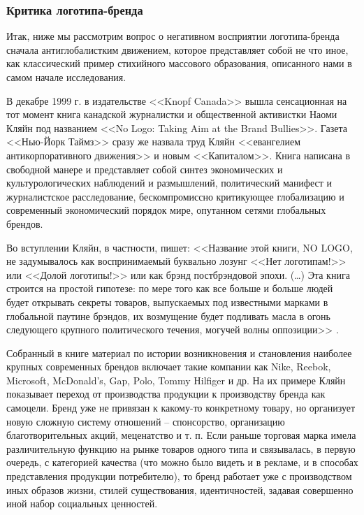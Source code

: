 \subsubsection{Критика логотипа-бренда}

Итак, ниже мы рассмотрим вопрос о негативном восприятии логотипа-бренда сначала антиглобалистким
движением, которое представляет собой не что иное, как классический пример стихийного массового
образования, описанного нами в самом начале исследования.

В декабре 1999 г. в издательстве <<Knopf Canada>> вышла сенсационная на тот момент книга канадской
журналистки и общественной активистки Наоми Кляйн под названием <<No Logo: Taking Aim at the Brand
Bullies>>. Газета <<Нью-Йорк Таймз>> сразу же назвала труд Кляйн <<евангелием антикорпоративного
движения>> и новым <<Капиталом>>. Книга написана в свободной манере и представляет собой синтез
экономических и культурологических наблюдений и размышлений, политический манифест и журналистское
расследование, бескомпромиссно критикующее глобализацию и современный экономический порядок мире,
опутанном сетями глобальных брендов.

Во вступлении Кляйн, в частности, пишет: <<Название этой книги, NO LOGO, не задумывалось как
воспринимаемый буквально лозунг <<Нет логотипам!>> или <<Долой логотипы!>> или как брэнд
постбрэндовой эпохи. (\ldots) Эта книга строится на простой гипотезе: по мере того как все больше и
больше людей будет открывать секреты товаров, выпускаемых под известными марками в глобальной
паутине брэндов, их возмущение будет подливать масла в огонь следующего крупного политического
течения, могучей волны оппозиции>> \autocite[][16-17]{klein2003}.

Собранный в книге материал по истории возникновения и становления наиболее крупных современных
брендов включает такие компании как Nike, Reebok, Microsoft, McDonald’s, Gap, Polo, Tommy Hilfiger и
др. На их примере Кляйн показывает переход от производства продукции к производству бренда как
самоцели. Бренд уже не привязан к какому-то конкретному товару, но организует новую сложную систему
отношений -- спонсорство, организацию благотворительных акций, меценатство и т. п. Если раньше
торговая марка имела различительную функцию на рынке товаров одного типа и связывалась, в первую
очередь, с категорией качества (что можно было видеть и в рекламе, и в способах представления
продукции потребителю), то бренд работает уже с производством иных образов жизни, стилей
существования, идентичностей, задавая совершенно иной набор социальных ценностей.

